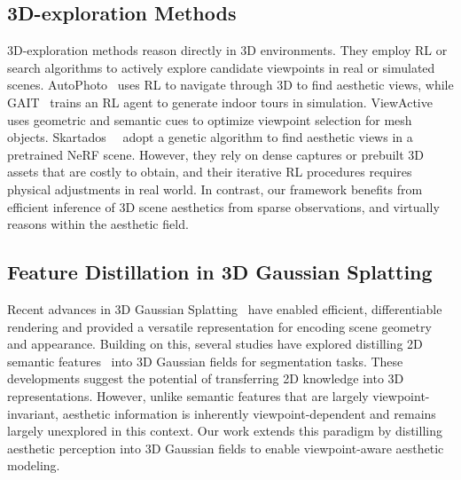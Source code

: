 \subsection{3D-exploration Methods}
3D-exploration methods reason directly in 3D environments. They employ RL or search algorithms to actively explore candidate viewpoints in real or simulated scenes. AutoPhoto~\cite{alzayer2021autophoto} uses RL to navigate through 3D to find aesthetic views, while GAIT~\cite{xie2023gait} trains an RL agent to generate indoor tours in simulation. ViewActive~\cite{wu2024viewactive} uses geometric and semantic cues to optimize viewpoint selection for mesh objects. Skartados~\etal~\cite{skartados2024finding} adopt a genetic algorithm to find aesthetic views in a pretrained NeRF scene. However, they rely on dense captures or prebuilt 3D assets that are costly to obtain, and their iterative RL procedures requires physical adjustments in real world. In contrast, our framework benefits from efficient inference of 3D scene aesthetics from sparse observations, and virtually reasons within the aesthetic field. 

\subsection{Feature Distillation in 3D Gaussian Splatting}
Recent advances in 3D Gaussian Splatting~\cite{kerbl20233d,mvsplat,depthsplat} have enabled efficient, differentiable rendering and provided a versatile representation for encoding scene geometry and appearance. Building on this, several studies have explored distilling 2D semantic features~\cite{qin2024langsplat,zhou2024feature,li2025semanticsplat,tian2025uniforward} into 3D Gaussian fields for segmentation tasks. These developments suggest the potential of transferring 2D knowledge into 3D representations. However, unlike semantic features that are largely viewpoint-invariant, aesthetic information is inherently viewpoint-dependent and remains largely unexplored in this context. Our work extends this paradigm by distilling aesthetic perception into 3D Gaussian fields to enable viewpoint-aware aesthetic modeling.
